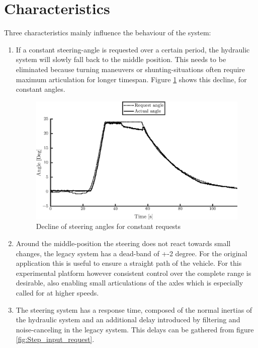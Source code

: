 \documentclass[root.tex]{subfiles}
\begin{document}
	
	{\pagestyle{empty}}
	\section{Characteristics}
	\label{chap:Delays}
	
	Three characteristics mainly influence the behaviour of the system: 
	
	\begin{enumerate}
		\item If a constant steering-angle is requested over a certain period, the hydraulic system will slowly fall back to the middle position. This needs to be eliminated because turning maneuvers or shunting-situations often require maximum articulation for longer timespan. Figure \ref{fig:Constant_request} shows this decline, for constant angles.
		
		\begin{figure}[!h]
			
			\includegraphics[width=1\linewidth]{front}
			\caption[Decline of steering angles for constant requests]{Decline of steering angles for constant requests}
			
			\label{fig:Constant_request}
		\end{figure}
		
		\item Around the middle-position the steering does not react towards small changes, the legacy system has a dead-band of +-2 degree. For the original application this is useful to ensure a straight path of the vehicle. For this experimental platform however consistent control over the complete range is desirable, also enabling small articulations of the axles which is especially called for at higher speeds. 
		
		\item The steering system has a response time, composed of the normal inertias of the hydraulic system and an additional delay introduced by filtering and noise-canceling in the legacy system. This delays can be gathered from figure \ref{fig:Step_input_request}.
		

\end{enumerate}
\end{document}
